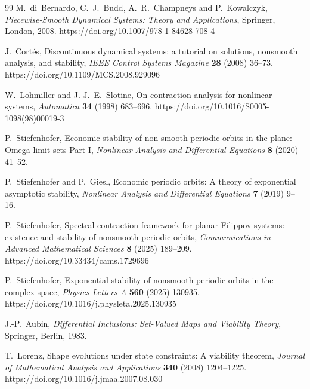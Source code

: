 \documentclass[12pt]{article}
\theoremstyle{plain}
\theoremstyle{definition}
\theoremstyle{remark}
\begin{document}
\begin{thebibliography}{99}
M.~di~Bernardo, C.~J.~Budd, A.~R.~Champneys and P.~Kowalczyk,
\emph{Piecewise-Smooth Dynamical Systems: Theory and Applications},
Springer, London, 2008.
https://doi.org/10.1007/978-1-84628-708-4

J.~Cort\'es,
Discontinuous dynamical systems: a tutorial on solutions, nonsmooth analysis, and stability,
\emph{IEEE Control Systems Magazine}
\textbf{28} (2008) 36--73.
https://doi.org/10.1109/MCS.2008.929096


W.~Lohmiller and J.-J.~E.~Slotine,
On contraction analysis for nonlinear systems,
\emph{Automatica}
\textbf{34} (1998) 683--696.
https://doi.org/10.1016/S0005-1098(98)00019-3


P.~Stiefenhofer,
Economic stability of non-smooth periodic orbits in the plane:
Omega limit sets Part I,
\emph{Nonlinear Analysis and Differential Equations}
\textbf{8} (2020) 41--52.

P.~Stiefenhofer and P.~Giesl,
Economic periodic orbits: A theory of exponential asymptotic stability,
\emph{Nonlinear Analysis and Differential Equations}
\textbf{7} (2019) 9--16.

P.~Stiefenhofer,
Spectral contraction framework for planar Filippov systems:
existence and stability of nonsmooth periodic orbits,
\emph{Communications in Advanced Mathematical Sciences}
\textbf{8} (2025) 189--209.
https://doi.org/10.33434/cams.1729696

P.~Stiefenhofer,
Exponential stability of nonsmooth periodic orbits in the complex space,
\emph{Physics Letters A}
\textbf{560} (2025) 130935.
https://doi.org/10.1016/j.physleta.2025.130935


J.-P.~Aubin,
\emph{Differential Inclusions: Set-Valued Maps and Viability Theory},
Springer, Berlin, 1983.

T.~Lorenz,
Shape evolutions under state constraints: A viability theorem,
\emph{Journal of Mathematical Analysis and Applications}
\textbf{340} (2008) 1204--1225.
https://doi.org/10.1016/j.jmaa.2007.08.030


\end{thebibliography}
\end{document}
